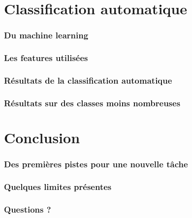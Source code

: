 \documentclass[10pt]{beamer}
\begin{document}
\section{Classification automatique}
\label{sec:machinelearning}

\begin{frame}
  \frametitle{Du machine learning}
\end{frame}

\begin{frame}
  \frametitle{Les features utilisées}
\end{frame}

\begin{frame}
  \frametitle{Résultats de la classification automatique}
\end{frame}

\begin{frame}
  \frametitle{Résultats sur des classes moins nombreuses}
\end{frame}

\section{Conclusion}
\label{sec:conclusion}

\begin{frame}
  \frametitle{Des premières pistes pour une nouvelle tâche}
\end{frame}

\begin{frame}
  \frametitle{Quelques limites présentes}
\end{frame}

\begin{frame}
  \frametitle{Questions ?}
\end{frame}
\end{document}
